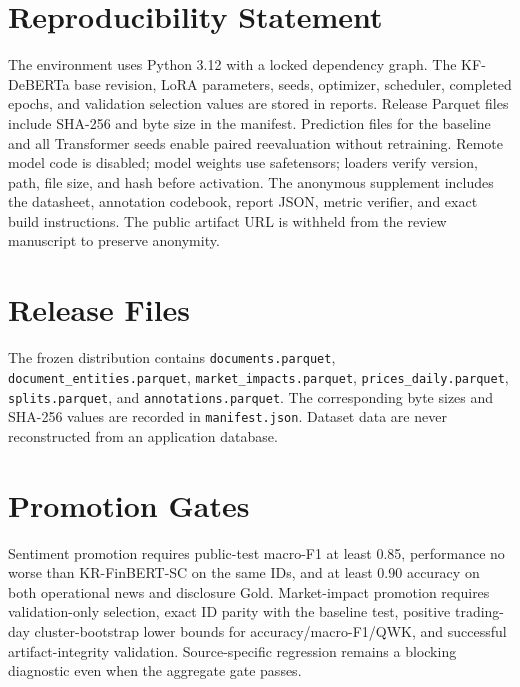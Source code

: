 \documentclass[11pt]{article}
\begin{document}
\section*{Reproducibility Statement}

The environment uses Python 3.12 with a locked dependency graph. The KF-DeBERTa base revision, LoRA parameters, seeds, optimizer, scheduler, completed epochs, and validation selection values are stored in reports. Release Parquet files include SHA-256 and byte size in the manifest. Prediction files for the baseline and all Transformer seeds enable paired reevaluation without retraining. Remote model code is disabled; model weights use safetensors; loaders verify version, path, file size, and hash before activation. The anonymous supplement includes the datasheet, annotation codebook, report JSON, metric verifier, and exact build instructions. The public artifact URL is withheld from the review manuscript to preserve anonymity.



\appendix
\section{Release Files}

The frozen distribution contains \texttt{documents.parquet}, \texttt{document\_entities.parquet}, \texttt{market\_impacts.parquet}, \texttt{prices\_daily.parquet}, \texttt{splits.parquet}, and \texttt{annotations.parquet}. The corresponding byte sizes and SHA-256 values are recorded in \texttt{manifest.json}. Dataset data are never reconstructed from an application database.

\section{Promotion Gates}

Sentiment promotion requires public-test macro-F1 at least 0.85, performance no worse than KR-FinBERT-SC on the same IDs, and at least 0.90 accuracy on both operational news and disclosure Gold. Market-impact promotion requires validation-only selection, exact ID parity with the baseline test, positive trading-day cluster-bootstrap lower bounds for accuracy/macro-F1/QWK, and successful artifact-integrity validation. Source-specific regression remains a blocking diagnostic even when the aggregate gate passes.
\end{document}

